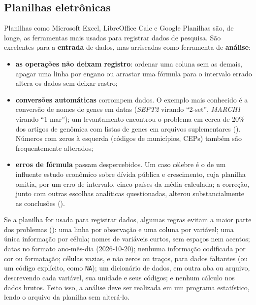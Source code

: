 \documentclass[
]{book}
\providecommand{\tightlist}{%
  \setlength{\itemsep}{0pt}\setlength{\parskip}{0pt}}
\begin{document}
\subsection{Planilhas eletrônicas}\label{planilhas-eletruxf4nicas}

Planilhas como Microsoft Excel, LibreOffice Calc e Google Planilhas são, de longe, as ferramentas mais usadas para registrar dados de pesquisa. São excelentes para a \textbf{entrada} de dados, mas arriscadas como ferramenta de \textbf{análise}:

\begin{itemize}
\tightlist
\item
  \textbf{as operações não deixam registro}: ordenar uma coluna sem as demais, apagar uma linha por engano ou arrastar uma fórmula para o intervalo errado altera os dados sem deixar rastro;
\item
  \textbf{conversões automáticas} corrompem dados. O exemplo mais conhecido é a conversão de nomes de genes em datas (\emph{SEPT2} virando ``2-set'', \emph{MARCH1} virando ``1-mar''); um levantamento encontrou o problema em cerca de 20\% dos artigos de genômica com listas de genes em arquivos suplementares (). Números com zeros à esquerda (códigos de municípios, CEPs) também são frequentemente alterados;
\item
  \textbf{erros de fórmula} passam despercebidos. Um caso célebre é o de um influente estudo econômico sobre dívida pública e crescimento, cuja planilha omitia, por um erro de intervalo, cinco países da média calculada; a correção, junto com outras escolhas analíticas questionadas, alterou substancialmente as conclusões ().
\end{itemize}

Se a planilha for usada para registrar dados, algumas regras evitam a maior parte dos problemas (): uma linha por observação e uma coluna por variável; uma única informação por célula; nomes de variáveis curtos, sem espaços nem acentos; datas no formato ano-mês-dia (2026-10-20); nenhuma informação codificada por cor ou formatação; células vazias, e não zeros ou traços, para dados faltantes (ou um código explícito, como \texttt{NA}); um dicionário de dados, em outra aba ou arquivo, descrevendo cada variável, sua unidade e seus códigos; e nenhum cálculo nos dados brutos. Feito isso, a análise deve ser realizada em um programa estatístico, lendo o arquivo da planilha sem alterá-lo.
\end{document}
